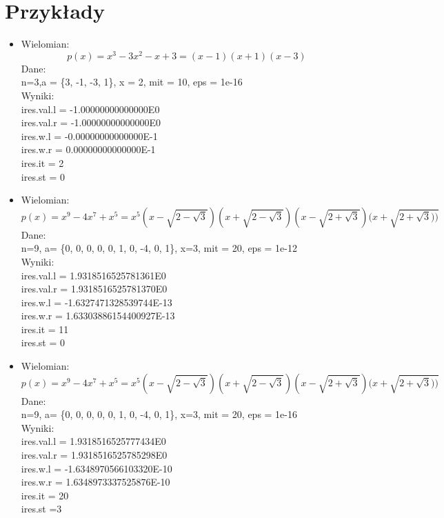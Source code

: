 \documentclass[a4paper]{article}
\begin{document}
\section{Przykłady}
\begin{itemize}
\item Wielomian: 
$$ p(x) = x^3 - 3x^2 - x + 3 = (x-1)(x+1)(x-3) $$
Dane:\\
n=3,a = \{3, -1, -3, 1\}, x = 2, mit = 10, eps = 1e-16 \\
Wyniki: \\
ires.val.l = -1.00000000000000E0\\
ires.val.r = -1.00000000000000E0\\
ires.w.l = -0.00000000000000E-1\\
ires.w.r = 0.00000000000000E-1\\
ires.it = 2\\
ires.st = 0\\

\item Wielomian:
$$ p(x) = x^9 - 4x^7 + x^5 = x^5(x-\sqrt{2-\sqrt{3}})(x+\sqrt{2-\sqrt{3}})(x-\sqrt{2+\sqrt{3}})(x+\sqrt{2+\sqrt{3}))} $$
Dane: \\
n=9, a= \{0, 0, 0, 0, 0, 1, 0, -4, 0, 1\}, x=3, mit = 20, eps = 1e-12 \\
Wyniki: \\
ires.val.l = 1.9318516525781361E0\\
ires.val.r = 1.9318516525781370E0\\
ires.w.l = -1.6327471328539744E-13\\
ires.w.r = 1.63303886154400927E-13\\
ires.it = 11\\
ires.st = 0\\

\item Wielomian:
$$ p(x) = x^9 - 4x^7 + x^5 = x^5(x-\sqrt{2-\sqrt{3}})(x+\sqrt{2-\sqrt{3}})(x-\sqrt{2+\sqrt{3}})(x+\sqrt{2+\sqrt{3}))} $$
Dane: \\
n=9, a= \{0, 0, 0, 0, 0, 1, 0, -4, 0, 1\}, x=3, mit = 20, eps = 1e-16 \\
Wyniki: \\
ires.val.l = 1.9318516525777434E0\\
ires.val.r = 1.9318516525785298E0\\
ires.w.l = -1.6348970566103320E-10\\
ires.w.r = 1.6348973337525876E-10\\
ires.it = 20\\
ires.st =3\\


\end{itemize}
\end{document}
